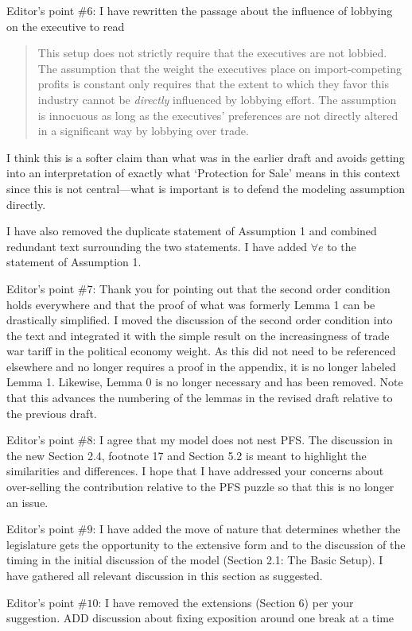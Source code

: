 \documentclass[12pt]{article}
\begin{document}
Editor's point $\#$6: I have rewritten the passage about the influence of lobbying on the executive to read
\begin{quote}
  This setup does not strictly require that the executives are not lobbied. The assumption that the weight the executives place on import-competing profits is constant only requires that the extent to which they favor this industry cannot be \textit{directly} influenced by lobbying effort. The assumption is innocuous as long as the executives' preferences are not directly altered in a significant way by lobbying over trade.
\end{quote}
I think this is a softer claim than what was in the earlier draft and avoids getting into an interpretation of exactly what `Protection for Sale' means in this context since this is not central---what is important is to defend the modeling assumption directly.

I have also removed the duplicate statement of Assumption 1 and combined redundant text surrounding the two statements. I have added $\forall e$ to the statement of Assumption 1.

Editor's point $\#$7: Thank you for pointing out that the second order condition holds everywhere and that the proof of what was formerly Lemma 1 can be drastically simplified. I moved the discussion of the second order condition into the text and integrated it with the simple result on the increasingness of trade war tariff in the political economy weight. As this did not need to be referenced elsewhere and no longer requires a proof in the appendix, it is no longer labeled Lemma 1. Likewise, Lemma 0 is no longer necessary and has been removed. Note that this advances the numbering of the lemmas in the revised draft relative to the previous draft. 

Editor's point $\#8$: I agree that my model does not nest PFS. The discussion in the new Section 2.4, footnote 17 and Section 5.2 is meant to highlight the similarities and differences. I hope that I have addressed your concerns about over-selling the contribution relative to the PFS puzzle so that this is no longer an issue.

Editor's point $\#9$: I have added the move of nature that determines whether the legislature gets the opportunity to the extensive form and to the discussion of the timing in the initial discussion of the model (Section 2.1: The Basic Setup). I have gathered all relevant discussion in this section as suggested.

Editor's point $\#10$: I have removed the extensions (Section 6) per your suggestion. {\color{blue}ADD discussion about fixing exposition around one break at a time}
\end{document}

